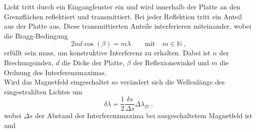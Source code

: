         Licht tritt durch ein Eingangfenster ein und wird innerhalb der Platte an den Grenzflächen reflektiert und transmittiert.
        Bei jeder Reflektion tritt ein Anteil aus der Platte aus.
        Diese transmittierten Anteile interferieren miteinander, wobei die Bragg-Bedingung
        \begin{equation}
            2 n d \cos(\beta) = m \lambda \qquad \text{mit} \quad m \in \mathbb{N} \;,
        \end{equation}
        erfüllt sein muss, um konstruktive Interferenz zu erhalten.
        Dabei ist $n$ der Brechungsindex, $d$ die Dicke der Platte, $\beta$ der Reflexionswinkel und $m$ die Ordnung des Interferenzmaximas.
        \\
        Wird das Magnetfeld eingeschaltet so verändert sich die Wellenlänge des eingestrahlten Lichtes um
        \begin{equation}
            \delta \lambda = \frac{1}{2} \frac{\delta s}{\Delta s} \Delta \lambda_D \;,
            \label{eqn:lambda}
        \end{equation}
        wobei $\Delta s$ der Abstand der Interferenzmaxima bei ausgeschaltetem Magnetfeld ist und 